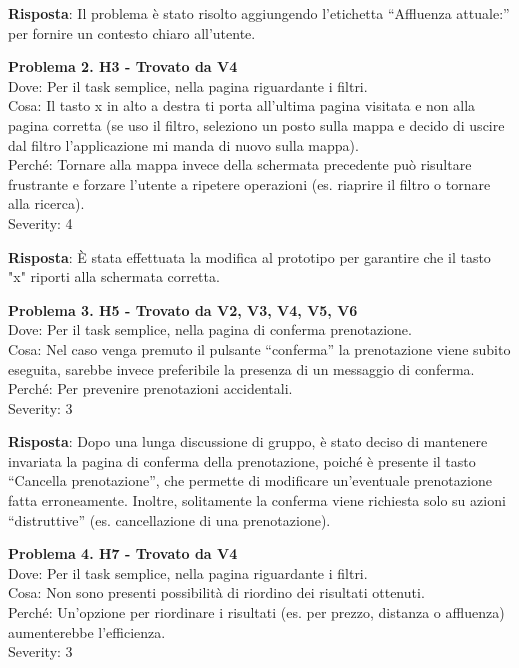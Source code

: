 \documentclass{article}
\begin{document}
\noindent \textbf{Risposta}: Il problema è stato risolto aggiungendo l’etichetta “Affluenza attuale:” per fornire un contesto chiaro all’utente.

\noindent \textbf{Problema 2. H3 - Trovato da V4} \\
Dove: Per il task semplice, nella pagina riguardante i filtri. \\
Cosa: Il tasto x in alto a destra ti porta all’ultima pagina visitata e non alla pagina corretta (se uso il filtro, seleziono un posto sulla mappa e decido di uscire dal filtro l’applicazione mi manda di nuovo sulla mappa). \\
Perché: Tornare alla mappa invece della schermata precedente può risultare frustrante e forzare l’utente a ripetere operazioni (es. riaprire il filtro o tornare alla ricerca). \\
Severity: 4

\noindent \textbf{Risposta}: È stata effettuata la modifica al prototipo per garantire che il tasto "x" riporti alla schermata corretta.

\noindent \textbf{Problema 3. H5 - Trovato da V2, V3, V4, V5, V6} \\
Dove: Per il task semplice, nella pagina di conferma prenotazione. \\
Cosa: Nel caso venga premuto il pulsante “conferma” la prenotazione viene subito eseguita, sarebbe invece preferibile la presenza di un messaggio di conferma. \\
Perché: Per prevenire prenotazioni accidentali. \\
Severity: 3

\noindent \textbf{Risposta}: Dopo una lunga discussione di gruppo, è stato deciso di mantenere invariata la pagina di conferma della prenotazione, poiché è presente il tasto “Cancella prenotazione”, che permette di modificare un’eventuale prenotazione fatta erroneamente. Inoltre, solitamente la conferma viene richiesta solo su azioni “distruttive” (es. cancellazione di una prenotazione).

\noindent \textbf{Problema 4. H7 - Trovato da V4} \\
Dove: Per il task semplice, nella pagina riguardante i filtri. \\
Cosa: Non sono presenti possibilità di riordino dei risultati ottenuti. \\
Perché: Un’opzione per riordinare i risultati (es. per prezzo, distanza o affluenza) aumenterebbe l’efficienza. \\
Severity: 3
\end{document}
